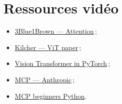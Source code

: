 \documentclass[11pt,a4paper]{article}
\begin{document}
\section{Ressources vidéo}

\begin{itemize}
  \item \href{https://www.youtube.com/watch?v=eMlx5fFNoYc}{3Blue1Brown --- Attention}\,;
  \item \href{https://www.youtube.com/watch?v=TrdevFK_am4}{Kilcher --- ViT paper}\,;
  \item \href{https://www.youtube.com/watch?v=ovB0ddFtzzA}{Vision Transformer in PyTorch}\,;
  \item \href{https://www.youtube.com/watch?v=CQywdSdi5iA}{MCP --- Anthropic}\,;
  \item \href{https://www.youtube.com/watch?v=LYfr7qusVSs}{MCP beginners Python}.
\end{itemize}
\end{document}
